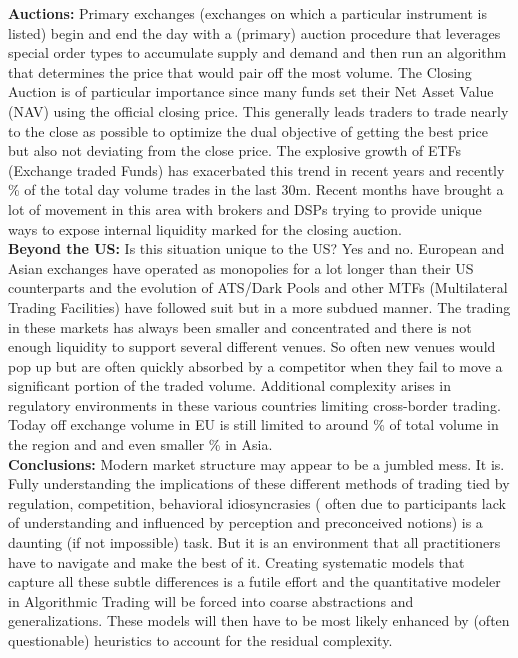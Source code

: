 \noindent\textbf{Auctions:} Primary exchanges (exchanges on which a particular instrument is listed) begin and end the day with a (primary) auction procedure that leverages special order types to accumulate supply and demand and then run an algorithm that determines the price that would pair off the most volume. The Closing Auction is of particular importance since many funds set their Net Asset Value (NAV) using the official closing price. This generally leads traders to trade nearly to the close as possible to optimize the dual objective of getting the best price but also not deviating from the close price. The explosive growth of ETFs (Exchange traded Funds) has exacerbated this trend in recent years and recently  \% of the total day volume trades in the last 30m. Recent months have brought a lot of movement in this area with brokers and DSPs trying to provide unique ways to expose internal liquidity marked for the closing auction. \\
 
 
\noindent\textbf{Beyond the US:} Is this situation unique to the US? Yes and no. European and Asian exchanges have operated as monopolies for a lot longer than their US counterparts and the evolution of ATS/Dark Pools and other MTFs (Multilateral Trading Facilities) have followed suit but in a more subdued manner. The trading in these markets has always been smaller and concentrated and there is not enough liquidity to support several different venues. So often new venues would pop up but are often quickly absorbed by a competitor when they fail to move a significant portion of the traded volume. Additional complexity arises in regulatory environments in these various countries limiting cross-border trading. Today off exchange volume in EU is still limited to around  \%  of total volume in the region and  and even smaller \% in Asia. \\


\noindent\textbf{Conclusions:} Modern market structure may appear to be a jumbled mess. It is. Fully understanding the implications of these different methods of trading tied by regulation, competition, behavioral idiosyncrasies ( often due to participants lack of understanding and influenced by perception and preconceived notions)  is a daunting (if not impossible) task. But it is an environment that all practitioners have to navigate and make the best of it. Creating systematic models that capture all these subtle differences is a futile effort and the quantitative modeler in Algorithmic Trading will be forced into coarse abstractions and generalizations. These models will then have to be most likely enhanced by (often questionable) heuristics to account for the residual complexity. 


